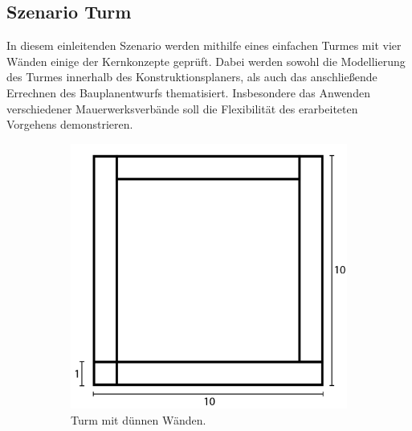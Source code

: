 \subsection{Szenario Turm}\label{scenarios:scenario1}
In diesem einleitenden Szenario werden mithilfe eines einfachen Turmes mit vier Wänden einige der Kernkonzepte geprüft.
Dabei werden sowohl die Modellierung des Turmes innerhalb des Konstruktionsplaners, als auch das anschließende Errechnen des Bauplanentwurfs thematisiert.
Insbesondere das Anwenden verschiedener Mauerwerksverbände soll die Flexibilität des erarbeiteten Vorgehens demonstrieren.
\begin{figure}[ht!]
  \hspace*{\fill}%
  \begin{subfigure}[b]{0.35\columnwidth}
    \includegraphics[width=\columnwidth]{fig/scenario1_story_plan_thin.png}
    \caption{Turm mit dünnen Wänden.}
  \end{subfigure}
  \hfill
  \begin{subfigure}[b]{0.35\columnwidth}

\end{subfigure}
\end{figure}
